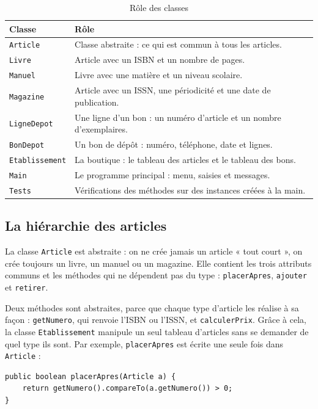 \documentclass[11pt,a4paper]{article}
\newcommand{\code}[1]{\texttt{#1}}
\begin{document}
\begin{table}[H]
\centering
\begin{tabularx}{\textwidth}{@{}lY@{}}
\toprule
Classe & Rôle \\
\midrule
\code{Article} & Classe abstraite : ce qui est commun à tous les articles. \\
\code{Livre} & Article avec un ISBN et un nombre de pages. \\
\code{Manuel} & Livre avec une matière et un niveau scolaire. \\
\code{Magazine} & Article avec un ISSN, une périodicité et une date de publication. \\
\code{LigneDepot} & Une ligne d'un bon : un numéro d'article et un nombre d'exemplaires. \\
\code{BonDepot} & Un bon de dépôt : numéro, téléphone, date et lignes. \\
\code{Etablissement} & La boutique : le tableau des articles et le tableau des bons. \\
\code{Main} & Le programme principal : menu, saisies et messages. \\
\code{Tests} & Vérifications des méthodes sur des instances créées à la main. \\
\bottomrule
\end{tabularx}
\caption{Rôle des classes}
\label{tab:classes}
\end{table}

\subsection{La hiérarchie des articles}

La classe \code{Article} est abstraite : on ne crée jamais un article « tout court », on crée
toujours un livre, un manuel ou un magazine. Elle contient les trois attributs communs et les
méthodes qui ne dépendent pas du type : \code{placerApres}, \code{ajouter} et \code{retirer}.

Deux méthodes sont abstraites, parce que chaque type d'article les réalise à sa façon :
\code{getNumero}, qui renvoie l'ISBN ou l'ISSN, et \code{calculerPrix}. Grâce à cela, la classe
\code{Etablissement} manipule un seul tableau d'articles sans se demander de quel type ils sont.
Par exemple, \code{placerApres} est écrite une seule fois dans \code{Article} :

\begin{lstlisting}
public boolean placerApres(Article a) {
    return getNumero().compareTo(a.getNumero()) > 0;
}
\end{lstlisting}
\end{document}
